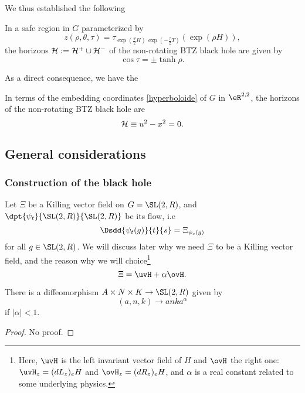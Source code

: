 We thus established the following
\begin{proposition}
In a safe region in $G$ parameterized by
\[
z(\rho,\theta,\tau) =\tau_{\exp(\frac{\theta}{2}H) \, \exp(-\frac{\tau}{2} T)}(\exp(\rho H)),
\]
 the horizons ${\cal H}:= {\cal H}^+ \cup {\cal H}^-$ of the non-rotating BTZ black hole are given by
\begin{equation}
 \cos \tau = \pm \tanh \rho.
 \end{equation}
\end{proposition}
As a direct consequence, we have the
\begin{corollary}		\label{CorHorClassLat}
In terms of the embedding coordinates \eqref{hyperboloide} of $G$ in
$\eR^{2,2}$, the horizons of the non-rotating BTZ black hole are
\begin{equation}
 {\cal H} \equiv u^2 - x^2 = 0.
 \end{equation}
 \end{corollary}

\subsection{General considerations}

\subsubsection{Construction of the black hole}

Let $\Xi$ be a Killing vector field on $G=\SL(2,R)$, and $\dpt{\psi_t}{\SL(2,R)}{\SL(2,R)}$ be its flow, i.e 
\[
\Dsdd{\psi_t(g)}{t}{s}=\Xi_{\psi_s(g)}
\]
for all $g\in\SL(2,R)$. We will discuss later why we need $\Xi$ to be a Killing vector field, and the reason why we will choice\footnote{Here, $\uvH$ is the left invariant vector field of $H$ and $\ovH$ the right one: $\uvH_z=(dL_z)_eH$ and $\ovH_z=(dR_z)_eH$, and $\alpha$ is a real constant related to some underlying physics.} 
\begin{equation}\label{eq:def_Xi}
\Xi=\uvH+\alpha\ovH.
\end{equation}

\begin{theorem}
There is a diffeomorphism $A\times N\times K\to \SL(2,R)$ given by
\[
 (a,n,k)\to anka^{\alpha}
\]
if $|\alpha|< 1$.
\end{theorem}
\begin{proof}
No proof.
\end{proof}

